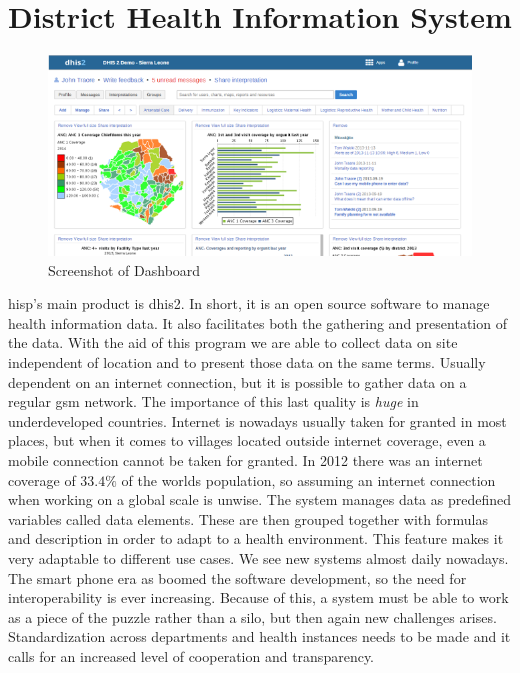 \section{District Health Information System}
\begin{figure}
\centering
\includegraphics[width=\columnwidth]{context/img/dhis2Dash}
\caption{Screenshot of Dashboard}
\label{fig:dash}
\end{figure}
\gls{hisp}'s main product is \gls{dhis2}. In short, it is an open source software to manage health information data. It also facilitates both the gathering and presentation of the data. With the aid of this program we are able to collect data on site independent of location and to present those data on the same terms. Usually dependent on an internet connection, but it is possible to gather data on a regular \gls{gsm} network. The importance of this last quality is \textit{huge} in underdeveloped countries. Internet is nowadays usually taken for granted in most places, but when it comes to villages located outside internet coverage, even a mobile connection cannot be taken for granted. In 2012 there was an internet coverage of $33.4\%$ of the worlds population, so assuming an internet connection when working on a global scale is unwise. The system manages data as predefined variables called data elements. These are then grouped together with formulas and description in order to adapt to a health environment. This feature makes it very adaptable to different use cases. We see new systems almost daily nowadays. The smart phone era as boomed the software development, so the need for interoperability is ever increasing. Because of this, a system must be able to work as a piece of the puzzle rather than a silo, but then again new challenges arises. Standardization across departments and health instances needs to be made and it calls for an increased level of cooperation and transparency.


